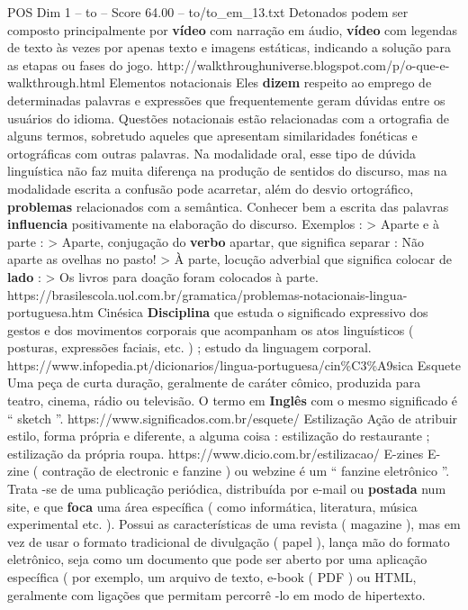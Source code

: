 \begin{textsample}{POS Dim 1 – to – Score 64.00 – to/to\_em\_13.txt}
Detonados podem ser composto principalmente por \textbf{vídeo} com narração em áudio, \textbf{vídeo} com legendas de texto às vezes por apenas texto e imagens estáticas, indicando a solução para as etapas ou fases do jogo. http://walkthroughuniverse.blogspot.com/p/o-que-e-walkthrough.html Elementos notacionais Eles \textbf{dizem} respeito ao emprego de determinadas palavras e expressões que frequentemente geram dúvidas entre os usuários do idioma.
Questões notacionais estão relacionadas com a ortografia de alguns termos, sobretudo aqueles que apresentam similaridades fonéticas e ortográficas com outras palavras.
Na modalidade oral, esse tipo de dúvida linguística não faz muita diferença na produção de sentidos do discurso, mas na modalidade escrita a confusão pode acarretar, além do desvio ortográfico, \textbf{problemas} relacionados com a semântica.
Conhecer bem a escrita das palavras \textbf{influencia} positivamente na elaboração do discurso.
Exemplos : > Aparte e à parte : > Aparte, conjugação do \textbf{verbo} apartar, que significa separar : Não aparte as ovelhas no pasto! > À parte, locução adverbial que significa colocar de \textbf{lado} : > Os livros para doação foram colocados à parte. https://brasilescola.uol.com.br/gramatica/problemas-notacionais-lingua-portuguesa.htm Cinésica \textbf{Disciplina} que estuda o significado expressivo dos gestos e dos movimentos corporais que acompanham os atos linguísticos ( posturas, expressões faciais, etc. ) ; estudo da linguagem corporal. https://www.infopedia.pt/dicionarios/lingua-portuguesa/cin\%C3\%A9sica Esquete Uma peça de curta duração, geralmente de caráter cômico, produzida para teatro, cinema, rádio ou televisão.
O termo em \textbf{Inglês} com o mesmo significado é “ sketch ”. https://www.significados.com.br/esquete/ Estilização Ação de atribuir estilo, forma própria e diferente, a alguma coisa : estilização do restaurante ; estilização da própria roupa. https://www.dicio.com.br/estilizacao/ E-zines E-zine ( contração de electronic e fanzine ) ou webzine é um “ fanzine eletrônico ”.
Trata -se de uma publicação periódica, distribuída por e-mail ou \textbf{postada} num site, e que \textbf{foca} uma área específica ( como informática, literatura, música experimental etc. ).
Possui as características de uma revista ( magazine ), mas em vez de usar o formato tradicional de divulgação ( papel ), lança mão do formato eletrônico, seja como um documento que pode ser aberto por uma aplicação específica ( por exemplo, um arquivo de texto, e-book ( PDF ) ou HTML, geralmente com ligações que permitam percorrê -lo em modo de hipertexto.

\end{textsample}
